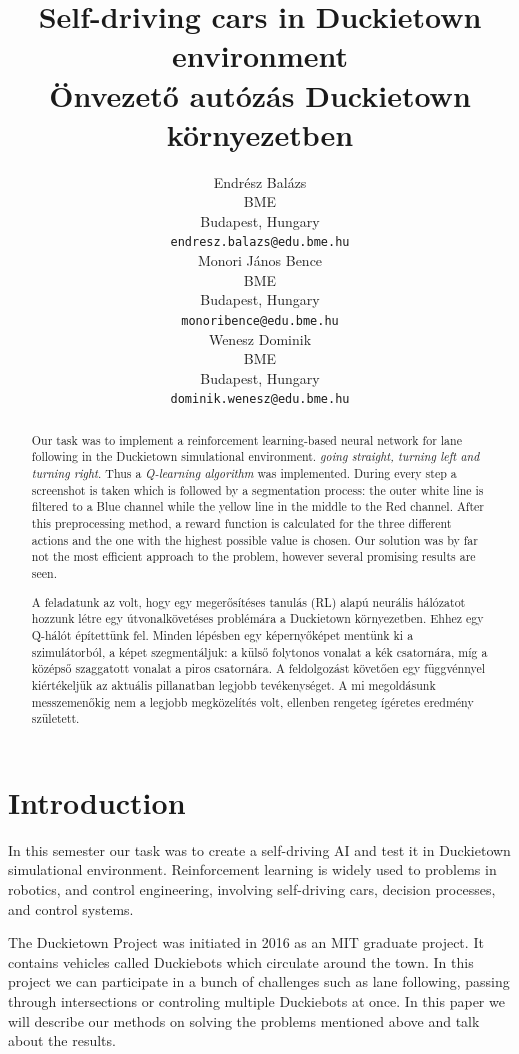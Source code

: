 \documentclass{article}
\title{Self-driving cars in Duckietown environment\\[10pt]Önvezető autózás Duckietown környezetben}
\author{
  Endrész Balázs \\
  BME \\
  Budapest, Hungary\\
  \texttt{endresz.balazs@edu.bme.hu} \\
  \And
  Monori János Bence \\
  BME \\
  Budapest, Hungary \\  
  \texttt{monoribence@edu.bme.hu} \\
  \AND
  Wenesz Dominik \\
  BME \\
  Budapest, Hungary \\
  \texttt{dominik.wenesz@edu.bme.hu} \\
}
\begin{document}
\maketitle

\begin{abstract}
  Our task was to implement a reinforcement learning-based neural
  network for lane following in the Duckietown simulational environment.
  \textit{going straight, turning left and turning right}. Thus a \textit{Q-learning algorithm}
  was implemented. During every step a screenshot is taken which is followed by a segmentation
  process: the outer white line is filtered to a Blue channel while the yellow line
  in the middle to the Red channel. After this preprocessing method, a reward function is calculated
  for the three different actions and the one with the highest possible value is chosen.
  Our solution was by far not the most efficient approach to the problem, however several
  promising results are seen. \par
  A feladatunk az volt, hogy egy megerősítéses tanulás (RL) alapú neurális hálózatot
  hozzunk létre egy útvonalkövetéses problémára a Duckietown környezetben. Ehhez egy
  Q-hálót építettünk fel. Minden lépésben egy képernyőképet mentünk ki a szimulátorból,
  a képet szegmentáljuk: a külső folytonos vonalat a kék csatornára, míg a középső szaggatott
  vonalat a piros csatornára. A feldolgozást követően egy függvénnyel kiértékeljük az aktuális
  pillanatban legjobb tevékenységet. A mi megoldásunk messzemenőkig nem a legjobb megközelítés volt,
  ellenben rengeteg ígéretes eredmény született.
\end{abstract}

\section{Introduction}

\thispagestyle{empty}
In this semester our task was to create a self-driving AI and test it in  Duckietown
simulational environment. Reinforcement learning is widely used to problems in robotics,
and control engineering, involving self-driving cars, decision processes, and control systems. 
\par
The Duckietown Project was initiated in 2016 as an MIT graduate project.\cite{gym_duckietown} It contains
vehicles called Duckiebots which circulate around the town. In this project we can participate
in a bunch of challenges such as lane following, passing through intersections or controling
multiple Duckiebots at once. In this paper we will describe our methods on solving the
problems mentioned above and talk about the results.
\end{document}
